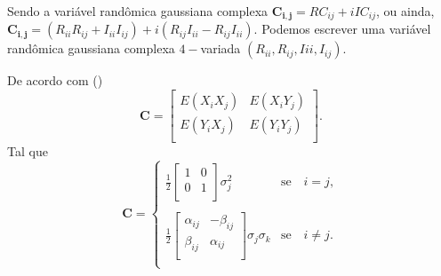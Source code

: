 Sendo a variável randômica gaussiana complexa $\mathbf{C_{i,j}}=RC_{ij} + i IC_{ij}$, ou ainda, $\mathbf{C_{i,j}}=(R_{ii}R_{ij}+I_{ii}I_{ij}) + i(R_{ij}I_{ii}-R_{ij}I_{ii})$. Podemos escrever uma variável randômica gaussiana complexa $4-$variada $(R_{ii},R_{ij},I{ii},I_{ij})$.

De acordo com (\cite{good})
\begin{equation}
\mathbf{C} = \left[
\begin{array}{cc}
	E(X_iX_j)  & E(X_iY_j)  \\
	E(Y_iX_j)  & E(Y_iY_j)  \\
\end{array}
\right].
\end{equation}
Tal que
\begin{equation}
\mathbf{C} =
\left\{
\begin{array}{cc}
	\frac{1}{2}\left[
\begin{array}{cc}
	 1 & 0  \\
	 0 & 1  \\
\end{array}
	\right]\sigma^{2}_{j}  & \mbox{se}\quad i=j, \\
	& \\
	\frac{1}{2}\left[
\begin{array}{cc}
	\alpha_{ij} & -\beta_{ij}  \\
	 \beta_{ij} & \alpha_{ij}  \\
\end{array}
	\right]\sigma_j\sigma_k  & \mbox{se}\quad i\neq j.   \\
\end{array}
\right.
\end{equation}

